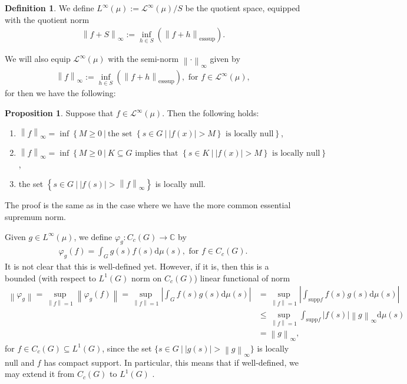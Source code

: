 \documentclass[10pt,twoside,openany,final]{memoir}
\theoremstyle{definition}
\newtheorem{proposition}[theorem]{Proposition}
\newtheorem{definition}[theorem]{Definition}
\theoremstyle{Break}
\newcommand{\lv}{\left\lVert}
\newcommand{\rv}{\right\rVert}
\newcommand{\C}{\mathbb{C}}
\renewcommand{\d}{\mathrm{d}}
\begin{document}
\begin{definition}
	We define $L^{\infty}(\mu):= \mathcal{L}^{\infty}(\mu) / S$ be the quotient space, equipped with the quotient norm 
	\begin{align*}
		\lv f+S\rv_{\infty}:=\inf_{h \in S}\left( \lv f+h\rv_{\mathrm{esssup}} \right).
	\end{align*}
\end{definition}
We will also equip $\mathcal{L}^{\infty}(\mu)$ with the semi-norm $\lv \cdot \rv_\infty$ given by
\begin{align*}
	\lv f \rv_{\infty}:=\inf_{h \in S}(\lv f+h\rv_{\mathrm{esssup}}), \text{ for } f \in \mathcal{L}^{\infty}(\mu),
\end{align*}
for then we have the following:
\begin{proposition}
	Suppose that $f\in \mathcal{L}^\infty(\mu)$. Then the following holds:
	\begin{enumerate}
		\item $\lv f \rv_{\infty}=\inf\left\{ M\geq 0 \ | \ \text{the set } \left\{ s \in G \ | \ |f(x)|>M \right\} \text{ is locally null}\right\}$,
		\item $\lv f \rv_{\infty}=\inf\left\{ M\geq 0 \ | \ K \subseteq G  \text{ implies that } \left\{ s \in K \ | \ |f(x)|>M \right\} \text{ is locally null}\right\}$,
		\item the set $\left\{ s \in G \ | \ |f(s)| > \lv f \rv_{\infty} \right\}$ is locally null.
	\end{enumerate}
	\label{lvinfty}
\end{proposition}
The proof is the same as in the case where we have the more common essential supremum norm.

Given $g \in L^\infty(\mu)$, we define $\varphi_g \colon C_c(G)\to \C$ by
\begin{align*}
	\varphi_g(f)=\int_{G} g(s)f(s) \d \mu(s), \text{ for } f \in C_c(G).
\end{align*}
It is not clear that this is well-defined yet. However, if it is, then this is a bounded (with respect to $L^1(G)$ norm on $C_c(G)$) linear functional of norm 
\begin{align*}
	\lv \varphi_g \rv = \sup_{\lv f \rv=1} \lv \varphi_g(f)\rv=\sup_{\lv f \rv = 1} \left| \int_G f(s) g(s) \d \mu(s)\right|&=\sup_{\lv f \rv = 1} \left| \int_{\textrm{supp} f}f(s)g(s) \d \mu(s)\right|\\
	&\leq \sup_{\lv f \rv = 1}  \int_{\textrm{supp}f} \left|f(s) \right| \lv g \rv_{\infty} \d \mu(s)\\
	&=\lv g \rv_{\infty},
\end{align*}
for $f \in C_c(G)\subseteq L^1(G)$, since the set  $\{s \in G \ \big| \ |g(s)|>\lv g \rv_{\infty}\}$ is locally null and $f$ has compact support. In particular, this means that if well-defined, we may extend it from $C_c(G)$ to $L^1(G)$ . 
\end{document}
